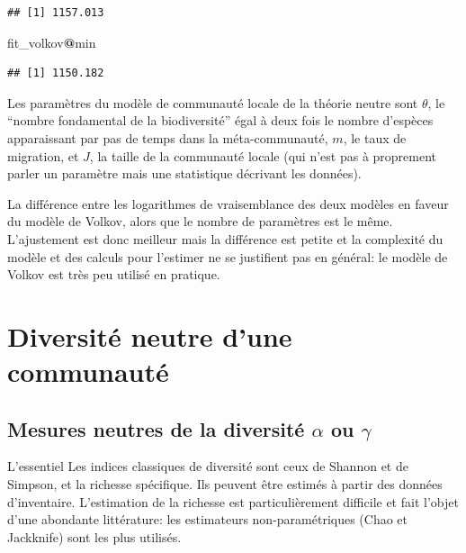 \documentclass[
  11pt,
  french,
  a4paper,
  extrafontsizes,onecolumn,openright
  ]{memoir}
\newenvironment{Shaded}{\begin{snugshade}}{\end{snugshade}}
\newcommand{\NormalTok}[1]{#1}
\newcommand{\OperatorTok}[1]{\textcolor[rgb]{0.81,0.36,0.00}{\textbf{#1}}}
\newenvironment{Summary}
  {\begin{bclogo}[logo=\bctrombone, noborder=true, couleur=lightgray!50]{L'essentiel}\parindent0pt}
  {\end{bclogo}}
\begin{document}
\begin{verbatim}
## [1] 1157.013
\end{verbatim}

\begin{Shaded}
\begin{Highlighting}[]
\NormalTok{fit_volkov}\OperatorTok{@}\NormalTok{min}
\end{Highlighting}
\end{Shaded}

\begin{verbatim}
## [1] 1150.182
\end{verbatim}

\normalsize

Les paramètres du modèle de communauté locale de la théorie neutre sont \(\theta\), le \enquote{nombre fondamental de la biodiversité} égal à deux fois le nombre d'espèces apparaissant par pas de temps dans la méta-communauté, \(m\), le taux de migration, et \(J\), la taille de la communauté locale (qui n'est pas à proprement parler un paramètre mais une statistique décrivant les données).

La différence entre les logarithmes de vraisemblance des deux modèles en faveur du modèle de Volkov, alors que le nombre de paramètres est le même.
L'ajustement est donc meilleur mais la différence est petite et la complexité du modèle et des calculs pour l'estimer ne se justifient pas en général: le modèle de Volkov est très peu utilisé en pratique.

\hypertarget{part-diversituxe9-neutre-dune-communautuxe9}{%
\part{Diversité neutre d'une communauté}\label{part-diversituxe9-neutre-dune-communautuxe9}}

\hypertarget{chap-MesuresNeutres}{%
\chapter{\texorpdfstring{Mesures neutres de la diversité \(\alpha\) ou \(\gamma\)}{Mesures neutres de la diversité \textbackslash alpha ou \textbackslash gamma}}\label{chap-MesuresNeutres}}

\scriptsize

\begin{Summary}
Les indices classiques de diversité sont ceux de Shannon et de Simpson,
et la richesse spécifique. Ils peuvent être estimés à partir des données
d'inventaire. L'estimation de la richesse est particulièrement difficile
et fait l'objet d'une abondante littérature: les estimateurs
non-paramétriques (Chao et Jackknife) sont les plus utilisés.
\end{Summary}
\end{document}
